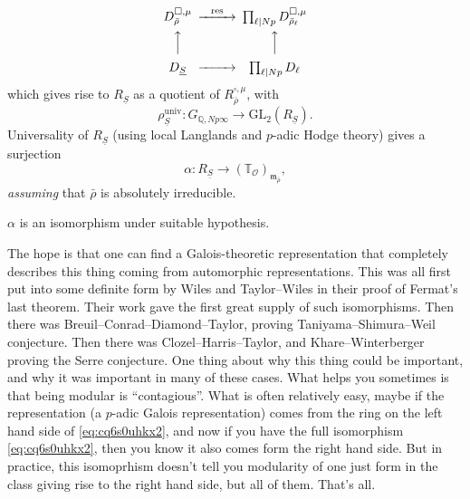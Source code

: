 \documentclass[reqno]{amsart} 
\begin{document}
\begin{equation*}
  \begin{CD}         
    D_{\bar{\rho}}^{\square, \mu} @> \res>> \prod_{\ell \mid N p}
    D_{\bar{\rho}_{\ell}}^{\square, \mu}\\
    @AAA  @AAA \\
    D_{\underline{S}}    @>>> \prod_{\ell \mid N p} D_{\ell}\\
  \end{CD}
\end{equation*}
which gives rise to $R_{\underline{S}}$ as a quotient of $R_{\bar{\rho}}^{\square, \mu}$, with
\begin{equation*}
  \rho_{\underline{S}}^{\mathrm{univ}} : G_{\mathbb{Q}, N p \infty} \rightarrow \mathrm{GL}_2(R_{\underline{S}}).
\end{equation*}
Universality of $R_{\underline{S}}$ (using local Langlands and $p$-adic Hodge theory) gives a surjection
\begin{equation}\label{eq:cq6s0uhkx2}
  \alpha : R_{\underline{S}} \rightarrow(\mathbb{T}_{\mathcal{O}})_{\mathfrak{m}_{\bar{\rho}}},
\end{equation}
\emph{assuming} that $\bar{\rho}$ is absolutely irreducible.
\begin{conjecture}\label{conjecture:cq6thpclm1}
  $\alpha$ is an isomorphism under suitable hypothesis.
\end{conjecture}
The hope is that one can find a Galois-theoretic representation that completely describes this thing coming from automorphic representations.  This was all first put into some definite form by Wiles and Taylor--Wiles in their proof of Fermat's last theorem.  Their work gave the first great supply of such isomorphisms.  Then there was Breuil--Conrad--Diamond--Taylor, proving Taniyama--Shimura--Weil conjecture.  Then there was Clozel--Harris--Taylor, and Khare--Winterberger proving the Serre conjecture.  One thing about why this thing could be important, and why it was important in many of these cases.  What helps you sometimes is that being modular is ``contagious''.  What is often relatively easy, maybe if the representation (a $p$-adic Galois representation) comes from the ring on the left hand side of \eqref{eq:cq6s0uhkx2}, and now if you have the full isomorphism \eqref{eq:cq6s0uhkx2}, then you know it also comes form the right hand side.  But in practice, this isomoprhism doesn't tell you modularity of one just form in the class giving rise to the right hand side, but all of them.  That's all.
\end{document}
